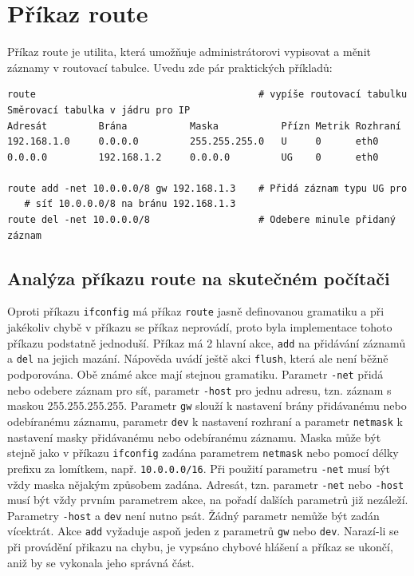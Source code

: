 
\section{Příkaz route}

Příkaz route je utilita, která umožňuje administrátorovi vypisovat a měnit záznamy v routovací tabulce. Uvedu zde pár praktických příkladů:
\begin{verbatim}
route                                       # vypíše routovací tabulku
Směrovací tabulka v jádru pro IP
Adresát         Brána           Maska           Přízn Metrik Rozhraní
192.168.1.0     0.0.0.0         255.255.255.0   U     0      eth0
0.0.0.0         192.168.1.2     0.0.0.0         UG    0      eth0

route add -net 10.0.0.0/8 gw 192.168.1.3    # Přidá záznam typu UG pro
   # síť 10.0.0.0/8 na bránu 192.168.1.3
route del -net 10.0.0.0/8                   # Odebere minule přidaný záznam
\end{verbatim}


\subsection{Analýza příkazu route na skutečném počítači}

Oproti příkazu \verb|ifconfig| má příkaz \verb|route| jasně definovanou gramatiku a při jakékoliv chybě v příkazu se příkaz neprovádí, proto byla implementace tohoto příkazu podstatně jednoduší. Příkaz má 2 hlavní akce, \verb|add| na přidávání záznamů a \verb|del| na jejich mazání. Nápověda uvádí ještě akci \verb|flush|, která ale není běžně podporována. Obě známé akce mají stejnou gramatiku. Parametr \verb|-net| přidá nebo odebere záznam pro síť, parametr \verb|-host| pro jednu adresu, tzn. záznam s maskou 255.255.255.255. Parametr \verb|gw| slouží k nastavení brány přidávanému nebo odebíranému záznamu, parametr \verb|dev| k nastavení rozhraní a parametr \verb|netmask| k nastavení masky přidávanému nebo odebíranému záznamu. Maska může být stejně jako v příkazu \verb|ifconfig| zadána parametrem \verb|netmask| nebo pomocí délky prefixu za lomítkem, např. \verb|10.0.0.0/16|. Při použití parametru \verb|-net| musí být vždy maska nějakým způsobem zadána. Adresát, tzn. parametr \verb|-net| nebo \verb|-host| musí být vždy prvním parametrem akce, na pořadí dalších parametrů již nezáleží. Parametry \verb|-host| a \verb|dev| není nutno psát. Žádný parametr nemůže být zadán vícektrát. Akce \verb|add| vyžaduje aspoň jeden z parametrů \verb|gw| nebo \verb|dev|. Narazí-li se při provádění přikazu na chybu, je vypsáno chybové hlášení a příkaz se ukončí, aniž by se vykonala jeho správná část.


